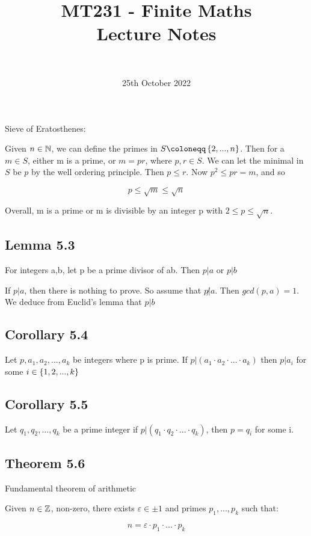 \documentclass[12pt]{article} %
\title{
    \vspace{2in}
        \textmd{\textbf{MT231 - Finite Maths}}\\
    \vspace{1in}
    \textmd{\textbf{Lecture Notes}}\\
    \vspace{1in}
}
\author{
    \hmwkAuthorName\\
    \hmwkStudentnum
}
\date{25th October 2022}
\begin{document}
\maketitle

\pagebreak

Sieve of Eratosthenes:

Given $n \in \mathbb{N}$, we can define the primes in $S \defeq \mset{2, ..., n}$. Then for a $m \in S$, either m is a prime, or
$m = pr$, where $p, r \in S$. We can let the minimal in $S$ be $p$ by the well ordering principle. Then $p \leq r$. Now $p^2 \leq p r = m$, and so

$$
    p \leq \sqrt{m} \leq \sqrt{n}
$$

Overall, m is a prime or m is divisible by an integer p with $2 \leq p \leq \sqrt{n}$.

\subsection*{Lemma 5.3}
\begin{grayBoxed}
    For integers a,b, let p be a prime divisor of ab. Then $p | a$ or $p | b$
\end{grayBoxed}

If $p|a$, then there is nothing to prove. So assume that $p \not | a$. Then $gcd(p, a) = 1$. We deduce from Euclid's lemma that $p | b$

\subsection*{Corollary 5.4}
Let $p, a_1, a_2, ..., a_k$ be integers where p is prime. If $p | (a_1 \cdot a_2\cdot ...\cdot a_k)$ then $p|a_i$ for some $i \in \left\{1, 2, ..., k\right\}$

\subsection*{Corollary 5.5}
Let $q_1, q_2, ..., q_k$ be a prime integer if $p | (q_1 \cdot q_2 \cdot ... \cdot q_k)$, then $p = q_i$ for some i.

\subsection*{Theorem 5.6}
\begin{grayBoxed}
    Fundamental theorem of arithmetic

    Given $n \in \mathbb{Z}$, non-zero, there exists $\varepsilon \in {\pm 1}$ and primes $p_1, ..., p_k$ such that:

    $$
        n = \varepsilon \cdot p_1 \cdot ... \cdot p_k
    $$
\end{grayBoxed}
\end{document}
